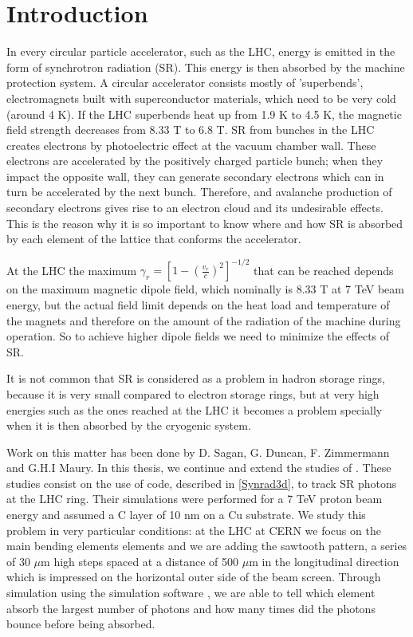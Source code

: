 
\chapter{Introduction} %

\label{intro} %


In every circular particle accelerator, such as the LHC, energy is emitted in the form of synchrotron radiation (SR). This energy is then absorbed by the machine protection system. A circular accelerator consists mostly of 'superbends', electromagnets built with superconductor materials, which need to be very cold (around 4 K). If the LHC superbends heat up from 1.9 K to 4.5 K, the magnetic field strength decreases from 8.33 T to 6.8 T\citep{faq}. SR from bunches in the LHC creates electrons by photoelectric effect at the vacuum chamber wall. These electrons are accelerated by the positively charged particle bunch; when they impact the opposite wall, they can generate secondary electrons which can in turn be accelerated by the next bunch. Therefore, and avalanche production of secondary electrons gives rise to an electron cloud and its undesirable effects\citep{miguel}. This is the reason why it is so important to know where and how SR is absorbed by each element of the lattice that conforms the accelerator.

At the LHC the maximum $\gamma_r = [1 - (\frac{v_r}{c})^{2}]^{-1/2}$ that can be reached depends on the maximum magnetic dipole field, which nominally is 8.33 T at 7 TeV beam energy, but the actual field limit depends on the heat load and temperature of the magnets and therefore on the amount of the radiation of the machine during operation\citep{DR}. So to achieve higher dipole fields we need to minimize the effects of SR.

It is not common that SR is considered as a problem in hadron storage rings, because it is very small compared to electron storage rings, but at very high energies such as the ones reached at the LHC it becomes a problem specially when it is then absorbed by the cryogenic system\citep{DR}.

Work on this matter has been done by D. Sagan, G. Duncan, F. Zimmermann and G.H.I Maury\citep{TUP}. In this thesis, we continue and extend the studies of \citep{TUP}. These studies consist on the use of  \srthree code, described in \ref{Synrad3d}, to track SR photons at the LHC ring. Their simulations were performed for a 7 TeV proton beam energy and assumed a C layer of 10 nm on a Cu substrate. We study this problem in very particular conditions: at the LHC at CERN we focus on the main bending elements elements and we are adding the sawtooth pattern, a series of 30 $\mu$m high steps spaced at a distance of 500 $\mu$m in the longitudinal direction which is impressed on the horizontal outer side of the beam screen. Through simulation using the simulation software \srthree , we are able to tell which element absorb the largest number of photons and  how many times did the photons bounce before being absorbed.

